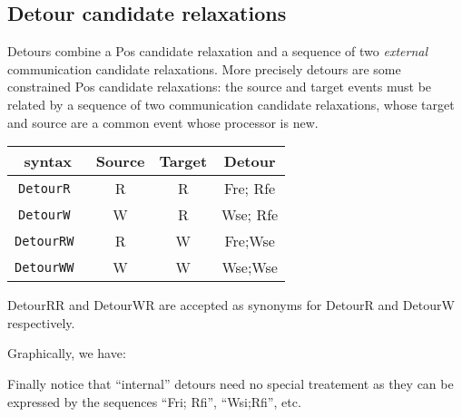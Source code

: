 \subsection{Detour \label{detour:def}candidate relaxations}
Detours combine a Pos candidate relaxation and a sequence
of two \emph{external} communication candidate relaxations.
More precisely detours are some constrained Pos candidate relaxations:
the source and target events must be related by a sequence of
two communication candidate relaxations, whose target and source
are a common event whose processor is new.
\begin{center}
\begin{tabular}{c|c|c|c}
\diy{} syntax  &  Source & Target  & Detour \\ \hline
\tt DetourR & R & R & Fre; Rfe \\ \hline
\tt DetourW & W & R & Wse; Rfe  \\ \hline
\tt DetourRW & R & W & Fre;Wse \\ \hline
\tt DetourWW & W & W & Wse;Wse \\ \hline
\end{tabular}
\end{center}
DetourRR and DetourWR are accepted as synonyms for
DetourR and DetourW respectively.

Graphically, we have:
\begin{center}
\quad
{}\quad
{}\quad
{}
\end{center}
Finally notice that ``internal'' detours need no special treatement
as they can be expressed by the sequences ``Fri; Rfi'', ``Wsi;Rfi'', etc.

